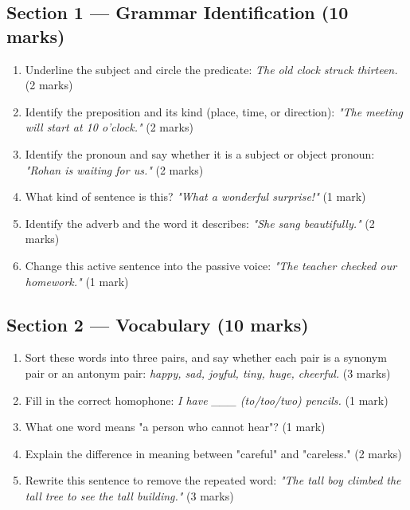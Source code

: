 \subsection*{Section 1 — Grammar Identification (10 marks)}
\begin{enumerate}
    \item Underline the subject and circle the predicate: \textit{The old clock struck thirteen.} (2 marks)
    \item Identify the preposition and its kind (place, time, or direction): \textit{"The meeting will start at 10 o'clock."} (2 marks)
    \item Identify the pronoun and say whether it is a subject or object pronoun: \textit{"Rohan is waiting for us."} (2 marks)
    \item What kind of sentence is this? \textit{"What a wonderful surprise!"} (1 mark)
    \item Identify the adverb and the word it describes: \textit{"She sang beautifully."} (2 marks)
    \item Change this active sentence into the passive voice: \textit{"The teacher checked our homework."} (1 mark)
\end{enumerate}

\subsection*{Section 2 — Vocabulary (10 marks)}
\begin{enumerate}
    \item Sort these words into three pairs, and say whether each pair is a synonym pair or an antonym pair: \textit{happy, sad, joyful, tiny, huge, cheerful.} (3 marks)
    \item Fill in the correct homophone: \textit{I have \_\_\_ (to/too/two) pencils.} (1 mark)
    \item What one word means "a person who cannot hear"? (1 mark)
    \item Explain the difference in meaning between "careful" and "careless." (2 marks)
    \item Rewrite this sentence to remove the repeated word: \textit{"The tall boy climbed the tall tree to see the tall building."} (3 marks)
\end{enumerate}

